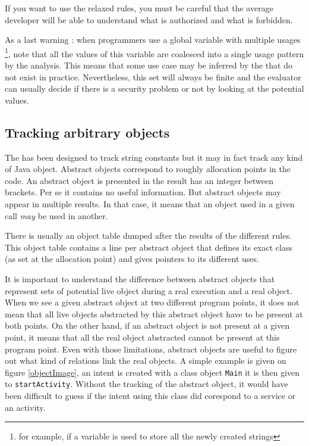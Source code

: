 If you want to use the relaxed rules, you must be careful that the average
developer will be able to understand what is authorized and what is forbidden.

As a last warning : when programmers use a global variable with
multiple usages \footnote{for example, if a variable is used to store all the newly created strings}, note that all 
the values of this variable are coalesced into a single
usage pattern by the analysis. This means that some use case may be inferred
by the \ma that do not exist in practice. Nevertheless, this set will always
be finite and the evaluator can usually decide if there is a security
 problem or not by looking at the potential values.

\subsection{Tracking arbitrary objects}
The \ma has been designed to track string constants but it may in fact track any
kind of Java object. Abstract objects correspond to roughly allocation points in
the code. An abstract object is presented in the result has an integer between
brackets. Per se it contains no useful information. But abstract objects may
appear in multiple results. In that case, it means that an object used in a
given call \emph{may} be used in another. 

There is usually an object table dumped after the results of the different
rules. This object table contains a line per abstract object that defines its
exact class (as set at the allocation point) and gives pointers to its different
uses.

It is important to understand the difference between abstract objects that
represent sets of potential live object during a real execution and a real
object. When we see a given abstract object at two different program points, it
does not mean that all live objects abstracted by this abstract object have to
be present at both points. On the other hand, if an abstract object is not
present at a given point, it means that all the real object abstracted cannot be
present at this program point. Even with those limitations, abstract objects are
useful to figure out what kind of relations link the real objects. A simple
example is given on figure \ref{objectImage}, an intent is created with a class
object \verb:Main: it is then given to  \verb!startActivity!. Without the
tracking of the abstract object, it would have been difficult to guess
if the intent using this class did corespond to a service or an activity.

